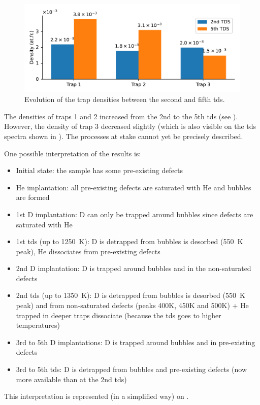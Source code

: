\begin{figure}
    \centering
    \includegraphics[width=\linewidth]{Figures/Chapter5/trap_densities.pdf}
    \caption{Evolution of the trap densities between the second and fifth \gls{tds}.}
\end{figure}

The densities of traps 1 and 2 increased from the 2nd to the 5th \gls{tds} (see ).
However, the density of trap 3 decreased slightly (which is also visible on the \gls{tds} spectra shown in ).
The processes at stake cannot yet be precisely described. 

One possible interpretation of the results is:
\begin{itemize}
    \item Initial state: the sample has some pre-existing defects %
    \item \gls{He} implantation: all pre-existing defects are saturated with \gls{He} and bubbles are formed
    \item 1st \gls{D} implantation: \gls{D} can only be trapped around bubbles since defects are saturated with \gls{He}
    \item 1st \gls{tds} (up to \SI{1250}{K}): \gls{D} is detrapped from bubbles is desorbed (\SI{550}{K} peak), \gls{He} dissociates from pre-existing defects 
    \item 2nd \gls{D} implantation: \gls{D} is trapped around bubbles and in the non-saturated defects
    \item 2nd \gls{tds} (up to \SI{1350}{K}): \gls{D} is detrapped from bubbles is desorbed (\SI{550}{K} peak) and from non-saturated defects (peaks 400K, 450K and 500K) + \gls{He} trapped in deeper traps dissociate (because the \gls{tds} goes to higher temperatures)
    \item 3rd to 5th \gls{D} implantations: \gls{D} is trapped around bubbles and in pre-existing defects
    \item 3rd to 5th \gls{tds}: \gls{D} is detrapped from bubbles and pre-existing defects (now more available than at the 2nd \gls{tds})
\end{itemize}
This interpretation is represented (in a simplified way) on .


